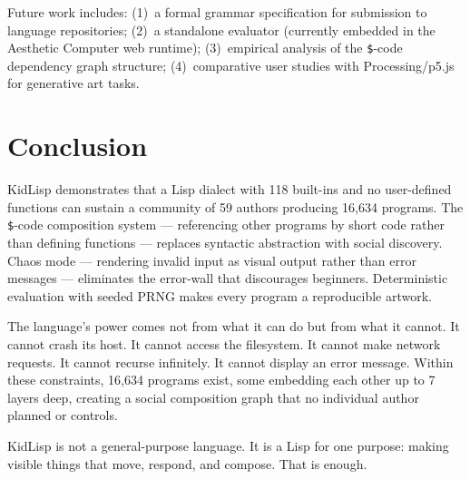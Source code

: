 \documentclass[sigconf,nonacm]{acmart}
\begin{document}
Future work includes: (1)~a formal grammar specification for submission to language repositories; (2)~a standalone evaluator (currently embedded in the Aesthetic Computer web runtime); (3)~empirical analysis of the \texttt{\$}-code dependency graph structure; (4)~comparative user studies with Processing/p5.js for generative art tasks.

\section{Conclusion}

KidLisp demonstrates that a Lisp dialect with 118 built-ins and no user-defined functions can sustain a community of 59 authors producing 16,634 programs. The \texttt{\$}-code composition system --- referencing other programs by short code rather than defining functions --- replaces syntactic abstraction with social discovery. Chaos mode --- rendering invalid input as visual output rather than error messages --- eliminates the error-wall that discourages beginners. Deterministic evaluation with seeded PRNG makes every program a reproducible artwork.

The language's power comes not from what it can do but from what it cannot. It cannot crash its host. It cannot access the filesystem. It cannot make network requests. It cannot recurse infinitely. It cannot display an error message. Within these constraints, 16,634 programs exist, some embedding each other up to 7 layers deep, creating a social composition graph that no individual author planned or controls.

KidLisp is not a general-purpose language. It is a Lisp for one purpose: making visible things that move, respond, and compose. That is enough.



\end{document}
